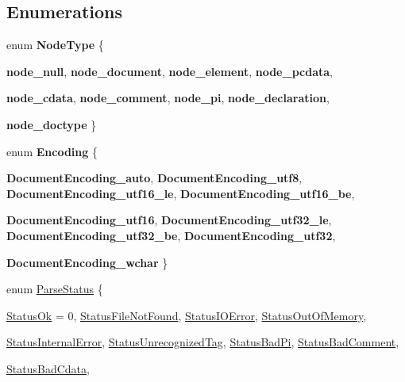 \subsection*{Enumerations}
\begin{DoxyCompactItemize}
\item 
enum {\bfseries NodeType} \{ \par
{\bfseries node\_\-null}, 
{\bfseries node\_\-document}, 
{\bfseries node\_\-element}, 
{\bfseries node\_\-pcdata}, 
\par
{\bfseries node\_\-cdata}, 
{\bfseries node\_\-comment}, 
{\bfseries node\_\-pi}, 
{\bfseries node\_\-declaration}, 
\par
{\bfseries node\_\-doctype}
 \}
\item 
enum {\bfseries Encoding} \{ \par
{\bfseries DocumentEncoding\_\-auto}, 
{\bfseries DocumentEncoding\_\-utf8}, 
{\bfseries DocumentEncoding\_\-utf16\_\-le}, 
{\bfseries DocumentEncoding\_\-utf16\_\-be}, 
\par
{\bfseries DocumentEncoding\_\-utf16}, 
{\bfseries DocumentEncoding\_\-utf32\_\-le}, 
{\bfseries DocumentEncoding\_\-utf32\_\-be}, 
{\bfseries DocumentEncoding\_\-utf32}, 
\par
{\bfseries DocumentEncoding\_\-wchar}
 \}
\item 
enum \hyperlink{namespacephys_1_1xml_ae7aabb879b21c73d8183a54470f8917f}{ParseStatus} \{ \par
\hyperlink{namespacephys_1_1xml_ae7aabb879b21c73d8183a54470f8917fa9ea9b3eecb4bb9f01745c94150982560}{StatusOk} =  0, 
\hyperlink{namespacephys_1_1xml_ae7aabb879b21c73d8183a54470f8917fa6f0279c8ce0103b77edcf3ce91fa64b4}{StatusFileNotFound}, 
\hyperlink{namespacephys_1_1xml_ae7aabb879b21c73d8183a54470f8917fa63f6d040311f50c1234a8eb873a0a95c}{StatusIOError}, 
\hyperlink{namespacephys_1_1xml_ae7aabb879b21c73d8183a54470f8917fac2a8163c9a8e285153d2a96b011bd49f}{StatusOutOfMemory}, 
\par
\hyperlink{namespacephys_1_1xml_ae7aabb879b21c73d8183a54470f8917fa458daab0a01f8dd3d0d85b4e41b9e187}{StatusInternalError}, 
\hyperlink{namespacephys_1_1xml_ae7aabb879b21c73d8183a54470f8917fabe0f4590debfa56c7e3a4c8da261b106}{StatusUnrecognizedTag}, 
\hyperlink{namespacephys_1_1xml_ae7aabb879b21c73d8183a54470f8917fa55afc9de133574f5c9376493c8e6fe09}{StatusBadPi}, 
\hyperlink{namespacephys_1_1xml_ae7aabb879b21c73d8183a54470f8917fa8f3864efd7b684ae57a8a7886a23f19a}{StatusBadComment}, 
\par
\hyperlink{namespacephys_1_1xml_ae7aabb879b21c73d8183a54470f8917fa18f36b8d712a6bbc716f90af8659df22}{StatusBadCdata}, 

\end{DoxyCompactItemize}
